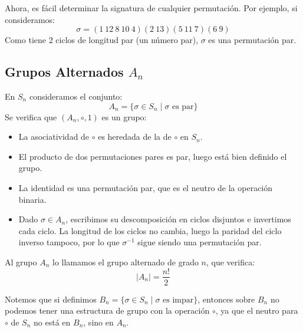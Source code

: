\begin{ejemplo}
    Ahora, es fácil determinar la signatura de cualquier permutación. Por ejemplo, si consideramos:
    \begin{equation*}
        \sigma = (1\ 12\ 8\ 10\ 4)(2\ 13)(5\ 11\ 7)(6\ 9)
    \end{equation*}
    Como tiene 2 ciclos de longitud par (un número par), $\sigma$ es una permutación par.
\end{ejemplo}

\subsection{Grupos Alternados $A_n$}
\begin{definicion}
    En $S_n$ consideramos el conjunto:
    \begin{equation*}
        A_n = \{\sigma\in S_n \mid \sigma \text{\ es par}\}
    \end{equation*}
    Se verifica que $(A_n,\circ,1)$ es un grupo:
    \begin{itemize}
        \item La asociatividad de $\circ$ es heredada de la de $\circ$ en $S_n$.
        \item El producto de dos permutaciones pares es par, luego está bien definido el grupo.
        \item La identidad es una permutación par, que es el neutro de la operación binaria.
        \item Dado $\sigma\in A_n$, escribimos su descomposición en ciclos disjuntos e invertimos cada ciclo. La longitud de los ciclos no cambia, luego la paridad del ciclo inverso tampoco, por lo que $\sigma^{-1}$ sigue siendo una permutación par.
    \end{itemize}
    Al grupo $A_n$ lo llamamos el grupo alternado de grado $n$, que verifica:
    \begin{equation*}
        |A_n| = \dfrac{n!}{2}
    \end{equation*}
\end{definicion}


\begin{observacion}
    Notemos que si definimos $B_n = \{\sigma\in S_n \mid \sigma \text{\ es impar}\}$, entonces sobre $B_n$ no podemos tener una estructura de grupo con la operación $\circ$, ya que el neutro para $\circ$ de $S_n$ no está en $B_n$, sino en $A_n$.
\end{observacion}

